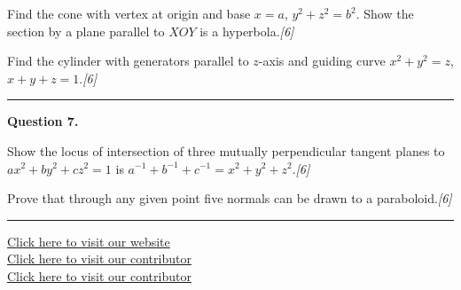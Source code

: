 \documentclass[11pt,a4paper]{article}
\newcommand{\pts}[1]{\hfill   \textit{[#1]}}
\begin{document}
\begin{parts}
  \item Find the cone with vertex at origin and base $x=a$, $y^2+z^2=b^2$. Show the section by a plane parallel to $XOY$ is a hyperbola.\pts{6}
  \item Find the cylinder with generators parallel to $z$-axis and guiding curve $x^2+y^2=z$, $x+y+z=1$.\pts{6}
\end{parts}
\medskip\rule{\linewidth}{0.2pt}

\medskip


\noindent   \textbf{Question 7.}

\begin{parts}
  \item Show the locus of intersection of three mutually perpendicular tangent planes to $ax^2+by^2+cz^2=1$ is $a^{-1}+b^{-1}+c^{-1}=x^2+y^2+z^2$.\pts{6}
  \item Prove that through any given point five normals can be drawn to a paraboloid.\pts{6}
\end{parts}

\vfill\rule{\linewidth}{0.4pt}

\begin{center}\small
\href{https://bhu-exam.vercel.app/}{Click here to visit our website}\\[4pt]
\href{https://me-aryan.vercel.app/}{Click here to visit our contributor}\\[4pt]
\href{https://quashan-me.vercel.app/}{Click here to visit our contributor}
\end{center}
\end{document}
